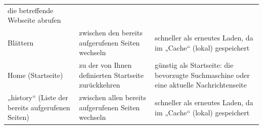 \documentclass[]{book}
\theoremstyle{definition}
\theoremstyle{definition}
\theoremstyle{definition}
\theoremstyle{remark}
\begin{document}
\begin{longtable}[]{@{}lll@{}}
\begin{minipage}[t]{0.27\columnwidth}
die betreffende Webseite abrufen\strut
\end{minipage} & \begin{minipage}[t]{0.33\columnwidth}\raggedright\strut
\strut
\end{minipage}\tabularnewline
\begin{minipage}[t]{0.31\columnwidth}\raggedright\strut
Blättern \vspace{5mm}\strut
\end{minipage} & \begin{minipage}[t]{0.27\columnwidth}\raggedright\strut
zwischen den bereits aufgerufenen Seiten wechseln \vspace{5mm}\strut
\end{minipage} & \begin{minipage}[t]{0.33\columnwidth}\raggedright\strut
schneller als erneutes Laden, da im „Cache`` (lokal) gespeichert
\vspace{5mm}\strut
\end{minipage}\tabularnewline
\begin{minipage}[t]{0.31\columnwidth}\raggedright\strut
Home (Startseite) \vspace{5mm}\strut
\end{minipage} & \begin{minipage}[t]{0.27\columnwidth}\raggedright\strut
zu der von Ihnen definierten Startseite zurückkehren \vspace{5mm}\strut
\end{minipage} & \begin{minipage}[t]{0.33\columnwidth}\raggedright\strut
günstig als Startseite: die bevorzugte Suchmaschine oder eine aktuelle
Nachrichtenseite\vspace{5mm}\strut
\end{minipage}\tabularnewline
\begin{minipage}[t]{0.31\columnwidth}\raggedright\strut
„history`` (Liste der bereits aufgerufenen Seiten) \vspace{5mm}\strut
\end{minipage} & \begin{minipage}[t]{0.27\columnwidth}\raggedright\strut
zwischen allen bereits aufgerufenen Seiten wechseln \vspace{5mm}\strut
\end{minipage} & \begin{minipage}[t]{0.33\columnwidth}\raggedright\strut
schneller als erneutes Laden, da im „Cache`` (lokal) gespeichert
\vspace{5mm}\strut
\end{minipage}\tabularnewline

\end{longtable}
\end{document}
